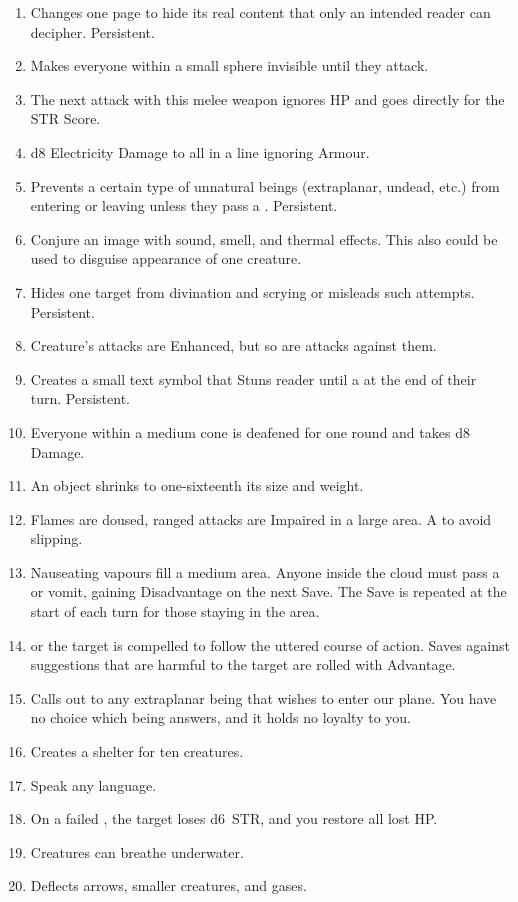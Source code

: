 \documentclass[itdr]{subfiles}
\begin{document}
\begin{enumerate}
	\item {} Changes one page to hide its real content that only an intended reader can decipher. Persistent.
	\item {} Makes everyone within a small sphere invisible until they attack.
	\item {} The next attack with this melee weapon ignores HP and goes directly for the STR Score.
	\vfill
	\break
	\item {} d8 Electricity Damage to all in a line ignoring Armour.
	\item {} Prevents a certain type of unnatural beings (extraplanar, undead, etc.) from entering or leaving unless they pass a . Persistent.
	\item {} Conjure an image with sound, smell, and thermal effects. This also could be used to disguise appearance of one creature.
	\item {} Hides one target from \mbox{divination} and scrying or misleads such attempts. \mbox{Persistent.}
	\item {} Creature's attacks are Enhanced, but so are attacks against them.
	\item {} Creates a small text symbol that Stuns reader until a  at the end of their turn. Persistent.
	\item {} Everyone within a medium cone is deafened for one round and takes d8 Damage.
	\item {} An object shrinks to one-sixteenth its size and weight.
	\item {} Flames are doused, ranged attacks are Impaired in a large area. A  to avoid slipping.
	\item {} Nauseating vapours fill a medium area. Anyone inside the cloud must pass a  or vomit, gaining Disadvantage on the next Save. The Save is repeated at the start of each turn for those staying in the area.
	\item {}  or the target is \mbox{compelled} to follow the uttered course of action. Saves against suggestions that are harmful to the target are rolled with Advantage.
	\item {} Calls out to any extraplanar being that wishes to enter our plane. You have no choice which being answers, and it holds no loyalty to you.
	\item {} Creates a shelter for ten creatures.
	\item {} Speak any language.
	\item {} On a failed , the target loses d6~STR, and you restore all lost HP.
	\item {} Creatures can breathe underwater.
	\item {} Deflects arrows, smaller creatures, and gases.
\end{enumerate}
\end{document}
